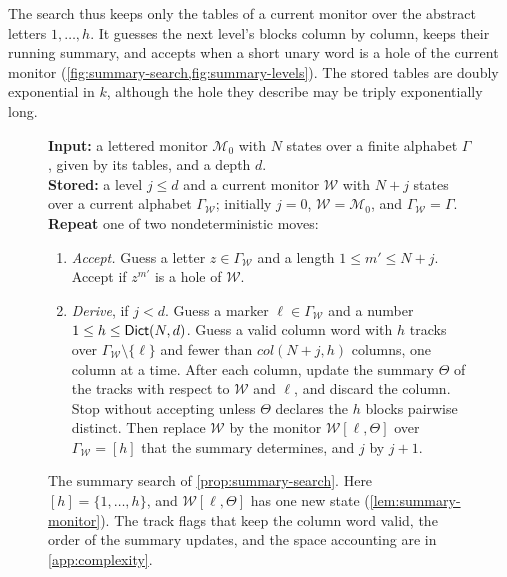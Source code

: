 The search thus keeps only the tables of a current monitor over the abstract
letters $1,\ldots,h$. It guesses the next level's blocks column by column,
keeps their running summary, and accepts when a short unary word is a hole of
the current monitor (\cref{fig:summary-search,fig:summary-levels}). The stored
tables are doubly exponential in $k$, although the hole they describe may be
triply exponentially long.

\begin{figure}[tbp]
\small
\begin{minipage}{0.94\linewidth}
\textbf{Input:} a lettered monitor $\mathcal M_0$ with $N$ states over a
finite alphabet $\Gamma$, given by its tables, and a depth $d$.\\
\textbf{Stored:} a level $j\le d$ and a current monitor $\mathcal W$ with
$N+j$ states over a current alphabet $\Gamma_{\mathcal W}$; initially $j=0$,
$\mathcal W=\mathcal M_0$, and $\Gamma_{\mathcal W}=\Gamma$.\\
\textbf{Repeat} one of two nondeterministic moves:
\begin{enumerate}[leftmargin=*,itemsep=2pt]
\item \emph{Accept.} Guess a letter $z\in\Gamma_{\mathcal W}$ and a length
$1\le m'\le N+j$. Accept if $z^{m'}$ is a hole of $\mathcal W$.
\item \emph{Derive}, if $j<d$. Guess a marker $\ell\in\Gamma_{\mathcal W}$ and
a number $1\le h\le\mathsf{Dict}(N,d)$. Guess a valid column word with $h$
tracks over $\Gamma_{\mathcal W}\setminus\{\ell\}$ and fewer than
$\mathit{col}(N+j,h)$ columns, one column at a time. After each column,
update the summary $\Theta$ of the tracks with respect to $\mathcal W$ and
$\ell$, and discard the column. Stop without accepting unless $\Theta$
declares the $h$ blocks pairwise distinct. Then replace $\mathcal W$ by the
monitor $\mathcal W[\ell,\Theta]$ over $\Gamma_{\mathcal W}=[h]$ that the
summary determines, and $j$ by $j+1$.
\end{enumerate}
\end{minipage}
\caption{The summary search of \cref{prop:summary-search}. Here
$[h]=\{1,\ldots,h\}$, and $\mathcal W[\ell,\Theta]$ has one new state
(\cref{lem:summary-monitor}). The track flags that keep the column word
valid, the order of the summary updates, and the space accounting are in
\cref{app:complexity}.}
\label{fig:summary-search}
\end{figure}

